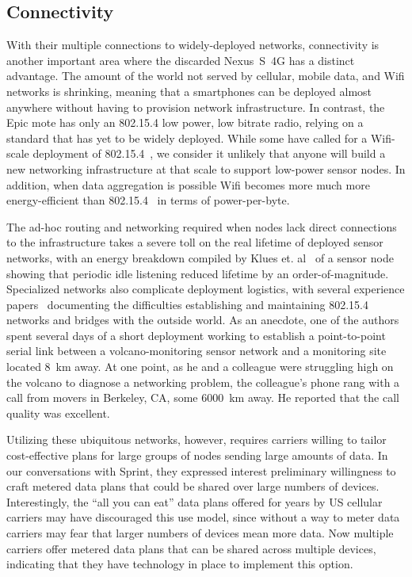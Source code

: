 \subsection{Connectivity}

With their multiple connections to widely-deployed networks, connectivity is
another important area where the discarded Nexus~S~4G has a distinct
advantage. The amount of the world not served by cellular, mobile data, and
Wifi networks is shrinking, meaning that a smartphones can be deployed almost
anywhere without having to provision network infrastructure. In contrast, the
Epic mote has only an 802.15.4 low power, low bitrate radio, relying on a
standard that has yet to be widely deployed. While some have called for a
Wifi-scale deployment of 802.15.4~\cite{leaves-ipsn12}, we consider it
unlikely that anyone will build a new networking infrastructure at that scale
to support low-power sensor nodes. In addition, when data aggregation is
possible Wifi becomes more much more energy-efficient than
802.15.4~\cite{wirelessenergyconsumption-url} in terms of power-per-byte.

The ad-hoc routing and networking required when nodes lack direct connections
to the infrastructure takes a severe toll on the real lifetime of deployed
sensor networks, with an energy breakdown compiled by Klues et.
al~\cite{icem-sosp07} of a sensor node showing that periodic idle listening
reduced lifetime by an order-of-magnitude. Specialized networks also
complicate deployment logistics, with several experience
papers~\cite{volcano-osdi06,hitchhikers-sensys08} documenting the difficulties
establishing and maintaining 802.15.4 networks and bridges with the outside
world. As an anecdote, one of the authors spent several days of a short
deployment working to establish a point-to-point serial link between a
volcano-monitoring sensor network and a monitoring site located 8~km away. At
one point, as he and a colleague were struggling high on the volcano to
diagnose a networking problem, the colleague's phone rang with a call from
movers in Berkeley, CA, some \num{6000}~km away. He reported that the call
quality was excellent.

Utilizing these ubiquitous networks, however, requires carriers willing to
tailor cost-effective plans for large groups of nodes sending large amounts
of data. In our conversations with Sprint, they expressed interest
preliminary willingness to craft metered data plans that could be shared over
large numbers of devices. Interestingly, the ``all you can eat'' data plans
offered for years by US cellular carriers may have discouraged this use
model, since without a way to meter data carriers may fear that larger
numbers of devices mean more data. Now multiple carriers offer metered data
plans that can be shared across multiple devices, indicating that they have
technology in place to implement this option.

